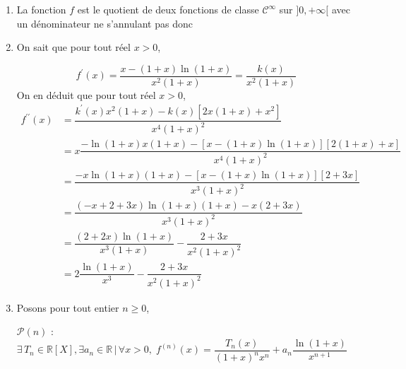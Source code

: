 \documentclass[a4paper,twoside,french,10pt]{VcCours}
\begin{document}
\begin{enumerate}
\item La fonction $f$ est le quotient de deux fonctions de classe $\mathcal{C}^{\infty}$ sur $]0, + \infty[$ avec un dénominateur ne s'annulant pas donc 

\fbox{$f$ est indéfiniment dérivable $\left]  0,+\infty\right[$}

\item On sait que pour tout réel $x>0$,

$$f^{\prime}\left(  x\right)  =\dfrac{x-\left(  1+x\right)  \ln\left(
1+x\right)  }{x^{2}\left(  1+x\right)  }=\dfrac{k\left(  x\right)  }%
{x^{2}\left(  1+x\right)  }$$
%
On en déduit que pour tout réel $x>0$,
\begin{align*}
f^{\prime\prime}\left(  x\right)   & =\dfrac{k^{\prime}\left(  x\right)
x^{2}\left(  1+x\right)  -k\left(  x\right)  \left[  2x\left(  1+x\right)
+x^{2}\right]  }{x^{4}\left(  1+x\right)  ^{2}}\\\
& =x\dfrac{-\ln\left(  1+x\right)  x\left(  1+x\right)  -\left[  x-\left(
1+x\right)  \ln\left(  1+x\right)  \right]  \left[  2\left(  1+x\right)
+x\right]  }{x^{4}\left(  1+x\right)  ^{2}}\\
& =\dfrac{-x\ln\left(  1+x\right)  \left(  1+x\right)  -\left[  x-\left(
1+x\right)  \ln\left(  1+x\right)  \right]  \left[  2+3x\right]  }%
{x^{3}\left(  1+x\right)  ^{2}}\\
& =\dfrac{\left(  -x+2+3x\right)  \ln\left(  1+x\right)  \left(  1+x\right)
-x\left(  2+3x\right)  }{x^{3}\left(  1+x\right)  ^{2}}\\
& =\dfrac{\left(  2+2x\right)  \ln\left(  1+x\right)  }{x^{3}\left(
1+x\right)  }-\dfrac{2+3x}{x^{2}\left(  1+x\right)  ^{2}}\\
& = \boxed{2\dfrac{\ln\left(  1+x\right)  }{x^{3} }-\dfrac
{2+3x}{x^{2}\left(  1+x\right)  ^{2}}}
\end{align*}

\item Posons pour tout entier $n \geq 0$,

\begin{center}
$\mathcal{P}(n)$ : \og $\exists \, T_n \in \mathbb{R}[X], \exists a_n \in \mathbb{R} \, \vert \, \forall x>0, \; f^{\left(  n\right)  }\left(
x\right)  =\dfrac{T_{n}\left(  x\right)  }{\left(  1+x\right)  ^{n}x^{n}%
}+a_{n}\dfrac{\ln\left(  1+x\right)  }{x^{n+1}}$ \fg
\end{center}


\end{enumerate}
\end{document}

